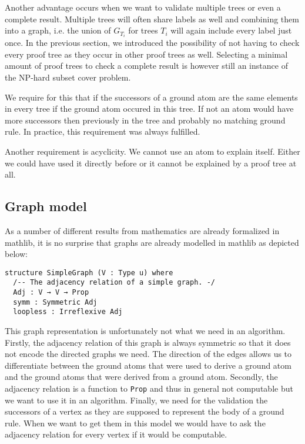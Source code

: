 Another advantage occurs when we want to validate multiple trees or even a complete result. Multiple trees will often share labels as well and combining them into a graph, i.e. the union of $G_{T_i}$ for trees $T_i$ will again include every label just once. In the previous section, we introduced the possibility of not having to check every proof tree as they occur in other proof trees as well. Selecting a minimal amount of proof trees to check a complete result is however still an instance of the NP-hard subset cover problem.

We require for this that if the successors of a ground atom are the same elements  in every tree if the ground atom occured in this tree. If not an atom would have more successors then previously in the tree and probably no matching ground rule. In practice, this requirement was always fulfilled.

Another requirement is acyclicity. We cannot use an atom to explain itself. Either we could have used it directly before or it cannot be explained by a proof tree at all. 
\subsection{Graph model}

As a number of different results from mathematics are already formalized in mathlib, it is no surprise that graphs are already modelled in mathlib as depicted below:

\begin{lstlisting}
structure SimpleGraph (V : Type u) where
  /-- The adjacency relation of a simple graph. -/
  Adj : V → V → Prop
  symm : Symmetric Adj 
  loopless : Irreflexive Adj
\end{lstlisting}

This graph representation is unfortunately not what we need in an algorithm. Firstly, the adjacency relation of this graph is always symmetric so that it does not encode the directed graphs we need. The direction of the edges allows us to differentiate between the ground atoms that were used to derive a ground atom and the ground atoms that were derived from a ground atom. Secondly, the adjacency relation is a function to \lstinline|Prop| and thus in general not computable but we want to use it in an algorithm. Finally, we need for the validation the successors of a vertex as they are supposed to represent the body of a ground rule. When we want to get them in this model we would have to ask the adjacency relation for every vertex if it would be computable.

